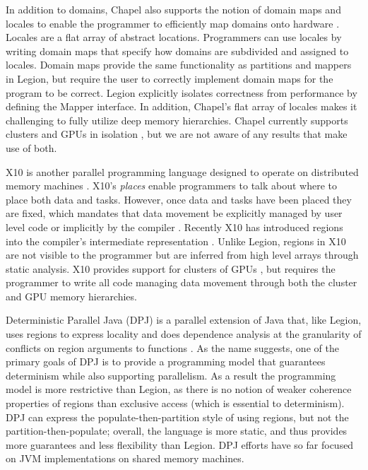 In addition to domains, Chapel also supports the notion of domain maps and locales to enable 
the programmer to efficiently map domains onto hardware \cite{CHAPEL11}.  Locales are a flat array
of abstract locations.  Programmers can use locales by writing domain maps that specify
how domains are subdivided and assigned to locales.  Domain maps provide the same functionality
as partitions and mappers in Legion, but require the user to correctly implement domain
maps for the program to be correct.  Legion explicitly isolates correctness
from performance by defining the Mapper interface.  In addition, Chapel's flat array of locales
makes it challenging to fully utilize deep memory hierarchies.  Chapel currently supports
clusters and GPUs in isolation \cite{CHAPELGPU}, but we are not aware of any results that 
make use of both.

X10 is another parallel programming language designed to operate on
distributed memory machines \cite{X1005}.  X10's {\em places} enable
programmers to talk about where to place both data and tasks.
However, once data and tasks have been placed they are fixed, which
mandates that data movement be explicitly managed by user level code
or implicitly by the compiler \cite{X1008}.  Recently X10
has introduced regions into the compiler's
intermediate representation \cite{X1011}.  Unlike Legion, regions in
X10 are not visible to the programmer but are inferred from high level
arrays through static analysis.  X10 provides support for clusters of
GPUs \cite{X10GPU}, but requires the programmer to write all code
managing data movement through both the cluster and GPU memory
hierarchies.

Deterministic Parallel Java (DPJ) is a parallel extension of Java
that, like Legion, uses regions to express locality and does
dependence analysis at the granularity of conflicts on region
arguments to functions \cite{Bocchino09}.  As the name suggests, one
of the primary goals of DPJ is to provide a programming model that
guarantees determinism while also supporting parallelism.
As a result the programming model is more restrictive than Legion, as
there is no notion of weaker coherence properties of regions than
exclusive access (which is essential to determinism).  DPJ can express
the populate-then-partition style of using regions, but not the
partition-then-populate; overall, the language is more static, and
thus provides more guarantees and less flexibility than Legion.  
DPJ efforts have so far focused on JVM implementations on shared memory machines.


